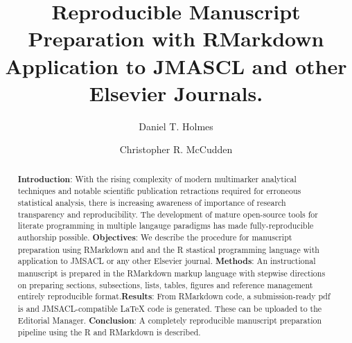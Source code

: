 \documentclass[]{elsarticle} %
\begin{document}
\begin{frontmatter}

  \title{Reproducible Manuscript Preparation with RMarkdown
\newline \large Application to JMASCL and other Elsevier Journals.}
    \author[SPH,UBC]{Daniel T. Holmes}
    \author[UO,TOH,EORLA]{Christopher R. McCudden}
      \address[SPH]{St.~Paul's Hospital Department of Pathology and
Laboratory Medicine, 1081 Burrard St., Vancouver, BC V6Z 1Y6 Canada}
    \address[UBC]{University of British Columbia Department of Pathology
and Laboratory Medicine, 2211 Wesbrook Mall, Vancouver, BC V6T 1Z7
Canada}
    \address[TOH]{Department of Pathology and Laboratory Medicine,
Ottawa Hospital, General Campus, 501 Smyth Road, Ottawa, ON K1H 8L6
Canada}
    \address[UO]{Department of Pathology and Laboratory Medicine,
University of Ottawa}
    \address[EORLA]{Eastern Ontario Regional Laboratory Association}
  
  \begin{abstract}
  \textbf{Introduction}: With the rising complexity of modern
  multimarker analytical techniques and notable scientific publication
  retractions required for erroneous statistical analysis, there is
  increasing awareness of importance of research transparency and
  reproducibility. The development of mature open-source tools for
  literate programming in multiple langauge paradigms has made
  fully-reproducible authorship possible. \newline \textbf{Objectives}:
  We describe the procedure for manuscript preparation using RMarkdown
  and and the R stastical programming language with application to
  JMSACL or any other Elsevier journal. \newline \textbf{Methods}: An
  instructional manuscript is prepared in the RMarkdown markup language
  with stepwise directions on preparing sections, subsections, lists,
  tables, figures and reference management entirely reproducible
  format.\newline \textbf{Results}: From RMarkdown code, a
  submission-ready pdf is and JMSACL-compatible LaTeX code is generated.
  These can be uploaded to the Editorial Manager.\newline
  \textbf{Conclusion}: A completely reproducible manuscript preparation
  pipeline using the R and RMarkdown is described.\newline
  \end{abstract}
  
 \end{frontmatter}
\end{document}
